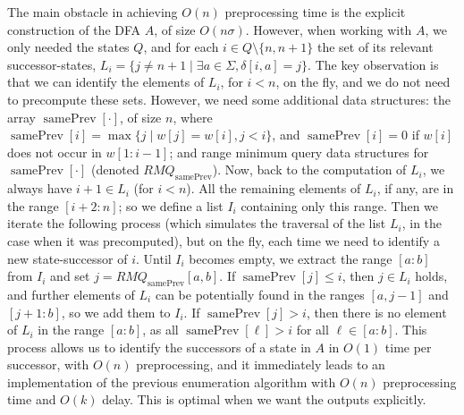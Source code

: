 \documentclass[runningheads,UKenglish,cleveref, autoref, thm-restate]{llncs}
\DeclareMathOperator{\prevArray}{samePrev}
\begin{document}
The main obstacle in achieving $O(n)$ preprocessing time is the explicit construction of the DFA $A$, of size $O(n\sigma)$. However, when working with $A$, we only needed the states $Q$, and for each $i\in Q\setminus \{n,n+1\}$ the set of its relevant successor-states, $L_i=\{j\neq n+1 \mid \exists a\in \Sigma, \delta[i,a]=j\}$. The key observation is that we can identify the elements of $L_i$, for $i<n$, on the fly, and we do not need to precompute these sets. However, we need some additional data structures: the array $\prevArray[\cdot]$, of size $n$, where $\prevArray[i]= \max \lbrace j \mid w[j] = w[i], j < i \rbrace$, and $\prevArray[i] = 0$ if $w[i] $ does not occur in $w[1:i-1]$; and range minimum query data structures for $\prevArray[\cdot]$ (denoted $RMQ_{\prevArray}$). Now, back to the computation of $L_i$, we always have $i+1\in L_i$ (for $i<n$). All the remaining elements of $L_i$, if any, are in the range $[i+2:n]$; so we define a list $I_i$ containing only this range. Then we iterate the following process (which simulates the traversal of the list $L_i$, in the case when it was precomputed), but on the fly, each time we need to identify a new state-successor of $i$. Until $I_i$ becomes empty, we extract the range $[a:b]$ from $I_i$ and set $j=RMQ_{\prevArray}[a,b]$. If $\prevArray[j]\leq i$, then $j\in L_i$ holds, and further elements of $L_i$ can be potentially found in the ranges $[a,j-1]$ and $[j+1:b]$, so we add them to $I_i$. If $\prevArray[j]> i$, then there is no element of $L_i$ in the range $[a:b]$, as all $\prevArray[\ell]>i$ for all $\ell\in [a:b]$. This process allows us to identify the successors of a state in $A$ in $O(1)$ time per successor, with $O(n)$ preprocessing, and it immediately leads to an implementation of the previous enumeration algorithm with $O(n)$ preprocessing time and $O(k)$ delay. This is optimal when we want the outputs explicitly. 
\end{document}
